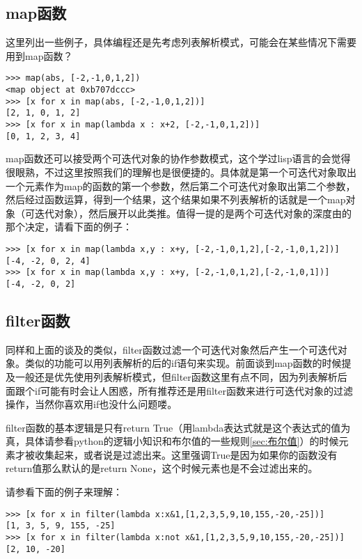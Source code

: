 \documentclass[12pt,oneside]{book}
\begin{document}
\begin{common-format}
\subsection{map函数}
这里列出一些例子，具体编程还是先考虑列表解析模式，可能会在某些情况下需要用到map函数？

\begin{Verbatim}
>>> map(abs, [-2,-1,0,1,2])
<map object at 0xb707dccc>
>>> [x for x in map(abs, [-2,-1,0,1,2])]
[2, 1, 0, 1, 2]
>>> [x for x in map(lambda x : x+2, [-2,-1,0,1,2])]
[0, 1, 2, 3, 4]
\end{Verbatim}


map函数还可以接受两个可迭代对象的协作参数模式，这个学过lisp语言的会觉得很眼熟，不过这里按照我们的理解也是很便捷的。具体就是第一个可迭代对象取出一个元素作为map的函数的第一个参数，然后第二个可迭代对象取出第二个参数，然后经过函数运算，得到一个结果，这个结果如果不列表解析的话就是一个map对象（可迭代对象），然后展开以此类推。值得一提的是两个可迭代对象的深度由的那个决定，请看下面的例子：
\begin{Verbatim}
>>> [x for x in map(lambda x,y : x+y, [-2,-1,0,1,2],[-2,-1,0,1,2])]
[-4, -2, 0, 2, 4]
>>> [x for x in map(lambda x,y : x+y, [-2,-1,0,1,2],[-2,-1,0,1])]
[-4, -2, 0, 2]
\end{Verbatim}

\subsection{filter函数}
同样和上面的谈及的类似，filter函数过滤一个可迭代对象然后产生一个可迭代对象。类似的功能可以用列表解析的后的if语句来实现。前面谈到map函数的时候提及一般还是优先使用列表解析模式，但filter函数这里有点不同，因为列表解析后面跟个if可能有时会让人困惑，所有推荐还是用filter函数来进行可迭代对象的过滤操作，当然你喜欢用if也没什么问题喽。

filter函数的基本逻辑是只有return True（用lambda表达式就是这个表达式的值为真，具体请参看python的逻辑小知识和布尔值的一些规则\ref{sec:布尔值}）的时候元素才被收集起来，或者说是过滤出来。这里强调True是因为如果你的函数没有return值那么默认的是return None，这个时候元素也是不会过滤出来的。

请参看下面的例子来理解：
\begin{Verbatim}
>>> [x for x in filter(lambda x:x&1,[1,2,3,5,9,10,155,-20,-25])]
[1, 3, 5, 9, 155, -25]
>>> [x for x in filter(lambda x:not x&1,[1,2,3,5,9,10,155,-20,-25])]
[2, 10, -20]
\end{Verbatim}



\end{common-format}
\end{document}
